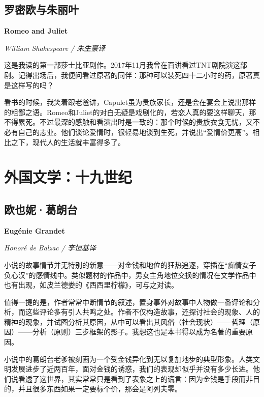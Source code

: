 \subsection*{罗密欧与朱丽叶}
\par \textbf{Romeo and Juliet}
\par \emph{William Shakespeare / 朱生豪译} 
\par 这是我读的第一部莎士比亚剧作。2017年11月我曾在百讲看过TNT剧院演这部剧。记得出场后，我便问看过原著的同伴：那种可以装死四十二小时的药，原著真是这样写的吗？
\par 看书的时候，我笑着跟老爸讲，Capulet虽为贵族家长，还是会在宴会上说出那样的粗鄙之语。Romeo和Juliet的对白无疑是戏剧化的，若恋人真的要这样聊天，那不得累死。不过最深的感触和看演出时是一致的：那个时候的贵族衣食无忧，又不必有自己的志业。他们谈论爱情时，很轻易地谈到生死，并说出“爱情价更高”。相比之下，现代人的生活就丰富得多了。
\par {}


\section{外国文学：十九世纪}

\subsection*{欧也妮·葛朗台}
\par \textbf{Eugénie Grandet}
\par \emph{Honoré de Balzac / 李恒基译} 
\par 小说的故事情节并无特别的新意——对金钱和地位的狂热追逐，穿插在“痴情女子负心汉”的感情线中。类似题材的作品中，男女主角地位交换的情况在文学作品中也有出现，如皮兰德娄的《西西里柠檬》，可与之对读。
\par 值得一提的是，作者常常中断情节的叙述，置身事外对故事中人物做一番评论和分析，而这些评论多有引人共鸣之处。作者不仅构造故事，还探讨社会的现象、人的精神的现象，并试图分析其原因，从中可以看出其风俗（社会现状）——哲理（原因）——分析（原则）三步框架的影子。我想这也是本书得以成为名著的重要原因。
\par 小说中的葛朗台老爹被刻画为一个受金钱异化到无以复加地步的典型形象。人类文明发展进步了近两百年，面对金钱的诱惑，我们的表现却似乎并没有多少长进。他们说看透了这世界，其实常常只是看到了表象之上的谎言：因为金钱是手段而非目的，并且很多东西如果一定要标个价，那会是阿列夫零。
\par {}

